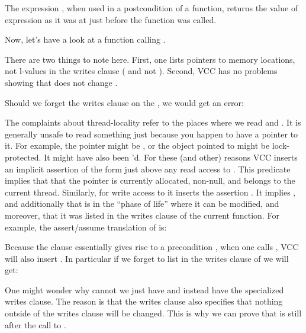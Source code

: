 
\noindent
The expression , when used in a postcondition of a function,
returns the value of expression 
as it was at just before the function was called.

Now, let's have a look at a function calling .


There are two things to note here.
First, one lists pointers to memory locations, not l-values in the writes
clause (\ie {} and not ).
Second, VCC has no problems showing that  does not change
.

Should we forget the writes clause on the , we would get an error:


\noindent
The complaints about thread-locality refer to the places where we
read  and .
It is generally unsafe to read something just because you happen to have a pointer to it.
For example, the pointer might be , or the object pointed to might be lock-protected.
It might have also been 'd.
For these (and other) reasons VCC inserts an implicit assertion of the form
 just above any read access to .
This predicate implies that that the pointer is currently allocated,
non-null, and belongs to the current thread.
Similarly, for write access to  it inserts the assertion
.
It implies ,
and additionally that  is in the ``phase of life'' where
it can be modified, and moreover, that it was listed in the writes
clause of the current function.
For example, the assert/assume translation of  is:


\noindent
Because the clause  essentially gives rise to a precondition
, when one calls ,
VCC will also insert .
In particular if we forget to list  in the writes
clause of  we will get:


One might wonder why cannot we just have 
 and instead have the specialized writes clause.
The reason is that the writes clause also specifies that nothing
outside of the writes clause will be changed.
This is why we can prove that  is still  after the call
to . 



